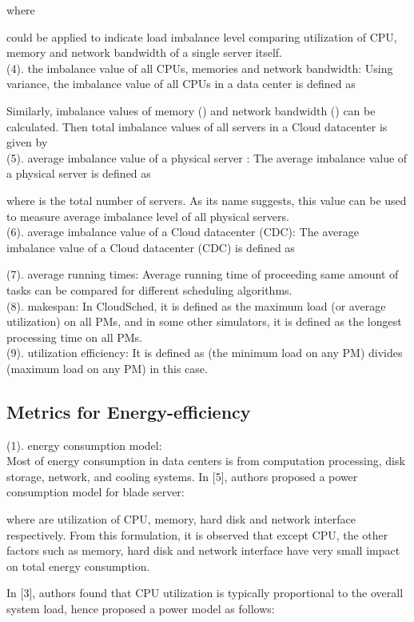 \documentclass[3p, twocolumn]{elsarticle}
\begin{document}
where

 could be applied to indicate load imbalance level comparing utilization of CPU, memory and network bandwidth of a single server itself.\\
(4). the imbalance value of all CPUs, memories and network bandwidth:
Using variance, the imbalance value of all CPUs in a data center is defined as

Similarly, imbalance values of memory () and network bandwidth () can be calculated.
Then total imbalance values of all servers in a Cloud datacenter is given by
\\
(5). average imbalance value of a physical server :
The average imbalance value of a physical server  is defined as

where  is the total number of servers. As its name suggests, this value can be used to measure average imbalance level of all physical servers.\\
(6). average imbalance value of a Cloud datacenter (CDC):
The average imbalance value of a Cloud datacenter (CDC) is defined as

(7). average running times:
Average running time of proceeding same amount of tasks can be compared for different scheduling algorithms.\\
(8). makespan:
In CloudSched, it is defined as the maximum load (or average utilization) on all PMs, and in some other simulators, it is defined as the longest processing time on all PMs.\\
(9). utilization efficiency: It is defined as (the minimum load on any PM) divides (maximum load on any PM) in this case.\\
\subsection{Metrics for Energy-efficiency}
\noindent (1). energy consumption model:\\
Most of energy consumption in data centers is from computation processing, disk storage, network, and cooling systems. In [5], authors proposed a power consumption model for blade server:

where  are utilization of CPU, memory, hard disk and network interface respectively. From this formulation, it is observed that except CPU, the other factors such as memory, hard disk and network interface have very small impact on total energy consumption.

In [3], authors found that CPU utilization is typically proportional to the overall system load, hence proposed a power model as follows:
\end{document}
